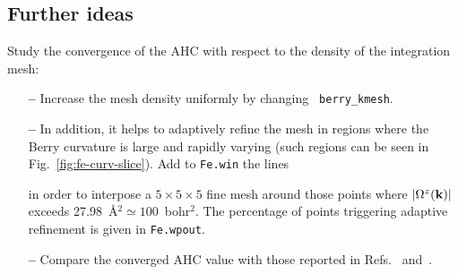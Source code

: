 \documentclass[a4paper,11pt,twoside]{article}
\begin{document}
\subsection*{Further ideas}

Study the convergence of the AHC with respect to the density of
  the integration mesh:

  \begin{itemize}

  \item[{\bf --}] Increase the mesh density uniformly by changing {\tt
      berry\_kmesh}.

  \item[{\bf --}] In addition, it helps to adaptively refine the mesh
    in regions where the Berry curvature is large and rapidly varying
    (such regions can be seen in Fig.~\ref{fig:fe-curv-slice}).  Add
    to {\tt Fe.win} the lines 
    
    in order to interpose a $5\times 5\times 5$ fine mesh around those
    points where $\vert\Omega^z({\bf k})\vert$ exceeds
    27.98~\AA$^2\simeq 100$~bohr$^2$. The percentage of points
    triggering adaptive refinement is given in {\tt Fe.wpout}.

  \item[{\bf --}] Compare the converged AHC value with those reported
    in Refs.~\cite{wang-prb06} and~\cite{yao-prl04}.

  \end{itemize}

%
%
  


\end{document}
